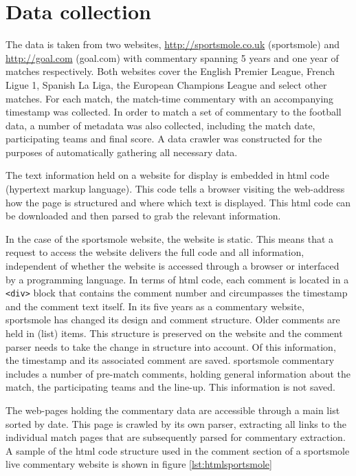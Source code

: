 \documentclass[10pt, a4paper]{UUThesisTemplate}
\begin{document}
\section{Data collection}

The data is taken from two websites, \url{http://sportsmole.co.uk} (sportsmole) and \url{http://goal.com} (goal.com) with commentary spanning 5 years and one year of matches respectively. Both websites cover the English Premier League, French Ligue 1, Spanish La Liga, the European Champions League and select other matches. For each match, the match-time commentary with an accompanying timestamp was collected. In order to match a set of commentary to the football data, a number of metadata was also collected, including the match date, participating teams and final score. A data crawler was constructed for the purposes of automatically gathering all necessary data.

The text information held on a website for display is embedded in html code (hypertext markup language). This code tells a browser visiting the web-address how the page is structured and where which text is displayed. This html code can be downloaded and then parsed to grab the relevant information.

In the case of the sportsmole website, the website is static. This means that a request to access the website delivers the full code and all information, independent of whether the website is accessed through a browser or interfaced by a programming language. In terms of html code, each comment is located in a \texttt{<div>} block that contains the comment number and circumpasses the timestamp and the comment text itself. In its five years as a commentary website, sportsmole has changed its design and comment structure. Older comments are held in  (list) items. This structure is preserved on the website and the comment parser needs to take the change in structure into account. Of this information, the timestamp and its associated comment are saved. sportsmole commentary includes a number of pre-match comments, holding general information about the match, the participating teams and the line-up. This information is not saved.

The web-pages holding the commentary data are accessible through a main list sorted by date. This page is crawled by its own parser, extracting all links to the individual match pages that are subsequently parsed for commentary extraction. A sample of the html code structure used in the comment section of a sportsmole live commentary website is shown in figure \ref{lst:htmlsportsmole}
\end{document}
